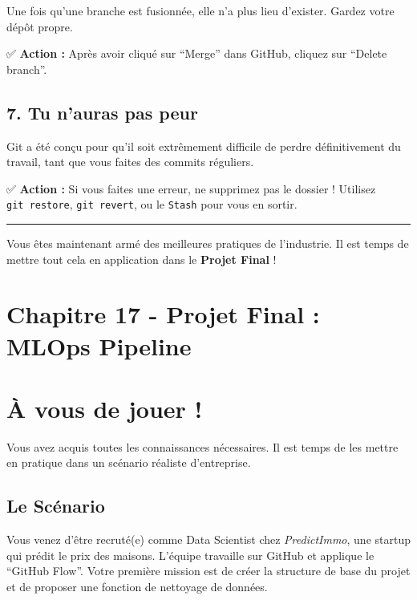 \documentclass[
  letterpaper,
  DIV=11,
  numbers=noendperiod]{scrreprt}
\begin{document}
Une fois qu'une branche est fusionnée, elle n'a plus lieu d'exister.
Gardez votre dépôt propre.

✅ \textbf{Action :} Après avoir cliqué sur ``Merge'' dans GitHub,
cliquez sur ``Delete branch''.

\subsection{7. Tu n'auras pas peur}\label{tu-nauras-pas-peur}

Git a été conçu pour qu'il soit extrêmement difficile de perdre
définitivement du travail, tant que vous faites des commits réguliers.

✅ \textbf{Action :} Si vous faites une erreur, ne supprimez pas le
dossier ! Utilisez \texttt{git\ restore}, \texttt{git\ revert}, ou le
\texttt{Stash} pour vous en sortir.

\begin{center}\rule{0.5\linewidth}{0.5pt}\end{center}

Vous êtes maintenant armé des meilleures pratiques de l'industrie. Il
est temps de mettre tout cela en application dans le \textbf{Projet
Final} !


\section{Chapitre 17 - Projet Final : MLOps
Pipeline}\label{chapitre-17---projet-final-mlops-pipeline}


\section{À vous de jouer !}\label{uxe0-vous-de-jouer}

Vous avez acquis toutes les connaissances nécessaires. Il est temps de
les mettre en pratique dans un scénario réaliste d'entreprise.

\subsection{Le Scénario}\label{le-scuxe9nario}

Vous venez d'être recruté(e) comme Data Scientist chez
\emph{PredictImmo}, une startup qui prédit le prix des maisons. L'équipe
travaille sur GitHub et applique le ``GitHub Flow''. Votre première
mission est de créer la structure de base du projet et de proposer une
fonction de nettoyage de données.
\end{document}

